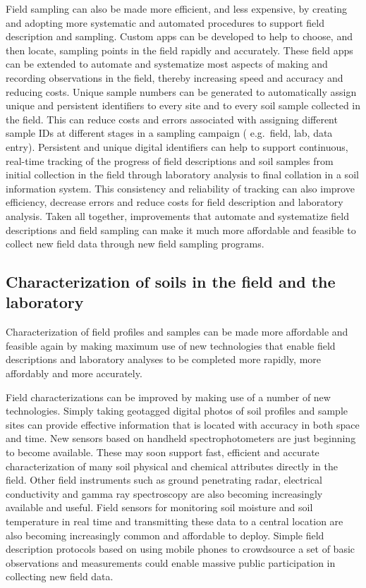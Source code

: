 \documentclass[graybox,natbib,nospthms,UStrade]{svmono}
\begin{document}
Field sampling can also be made more efficient, and less expensive, by
creating and adopting more systematic and automated procedures to
support field description and sampling. Custom apps can be developed to
help to choose, and then locate, sampling points in the field rapidly
and accurately. These field apps can be extended to automate and
systematize most aspects of making and recording observations in the
field, thereby increasing speed and accuracy and reducing costs. Unique
sample numbers can be generated to automatically assign unique and
persistent identifiers to every site and to every soil sample collected
in the field. This can reduce costs and errors associated with assigning
different sample IDs at different stages in a sampling campaign (
e.g.~field, lab, data entry). Persistent and unique digital identifiers can help to
support continuous, real-time tracking of the progress of field
descriptions and soil samples from initial collection in the field
through laboratory analysis to final collation in a soil information
system. This consistency and reliability of tracking can also improve
efficiency, decrease errors and reduce costs for field description and
laboratory analysis. Taken all together, improvements that automate and
systematize field descriptions and field sampling can make it much more
affordable and feasible to collect new field data through new field
sampling programs.

\hypertarget{characterization-of-soils-in-the-field-and-the-laboratory}{%
\subsection{Characterization of soils in the field and the laboratory}\label{characterization-of-soils-in-the-field-and-the-laboratory}}

Characterization of field profiles and samples can be made more
affordable and feasible again by making maximum use of new technologies
that enable field descriptions and laboratory analyses to be completed
more rapidly, more affordably and more accurately.

Field characterizations can be improved by making use of a number of new
technologies. Simply taking geotagged digital photos of soil profiles
and sample sites can provide effective information that is located with
accuracy in both space and time. New sensors based on handheld
spectrophotometers are just beginning to become available. These may
soon support fast, efficient and accurate characterization of many soil
physical and chemical attributes directly in the field. Other field
instruments such as ground penetrating radar, electrical conductivity
and gamma ray spectroscopy are also becoming increasingly available and
useful. Field sensors for monitoring soil moisture and soil temperature
in real time and transmitting these data to a central location are also
becoming increasingly common and affordable to deploy. Simple field
description protocols based on using mobile phones to crowdsource a set
of basic observations and measurements could enable massive public
participation in collecting new field data.
\end{document}
